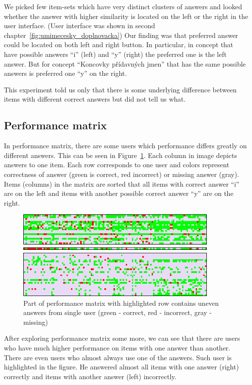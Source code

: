 \documentclass[
  print, %
  table,   %
  nolof,     %
  nolot,     %
  nocover,
  color,
  final,
]{fithesis3}
\begin{document}
We picked few item-sets which have very distinct clusters of answers and looked whether the answer with higher similarity is located on the left or the right in the user interface. (User interface was shown in second chapter~\ref{fig:umimecesky_doplnovacka}) Our finding was that preferred answer could be located on both left and right button. In particular, in concept \cviceniB{} that have possible answers ``i'' (left) and ``y'' (right) the preferred one is the left answer. But for concept ``Koncovky přídavných jmen'' that has the same possible answers is preferred one ``y'' on the right.

This experiment told us only that there is some underlying difference between items with different correct answers but did not tell us what.


\subsection{Performance matrix}\label{performance-matrix}

In performance matrix, there are some users which performance differs greatly on different answers. This can be seen in Figure~\ref{fig:performance_matrix}. Each column in image depicts answers to one item. Each row corresponds to one user and colors represent correctness of answer (green is correct, red incorrect) or missing answer (gray). Items (columns) in the matrix are sorted that all items with correct answer ``i'' are on the left and items with another possible correct answer ``y'' are on the right.

\begin{figure}
  \includegraphics[width=10cm]{img/performance_matrix}
  \caption{Part of performance matrix with highlighted row contains uneven answers from single user (green - correct, red - incorrect, gray - missing)}
  \label{fig:performance_matrix}
\end{figure}

After exploring performance matrix some more, we can see that there are users who have much higher performance on items with one answer than another. There are even users who almost always use one of the answers. Such user is highlighted in the figure. He answered almost all items with one answer (right) correctly and items with another answer (left) incorrectly.
\end{document}
